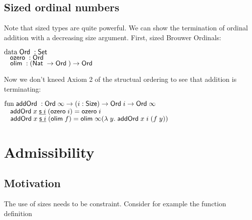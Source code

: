\subsection{Sized ordinal numbers}
Note that sized types are quite powerful. 
We can show the termination of ordinal addition with a decreasing size argument.
First, sized Brouwer Ordinals:
\begin{bsp}
$\mathrm{data}\; \mathsf{Ord}\; : \mathsf{Set}$ \\
$\hspace*{3mm} \mathsf{ozero}\; : \mathsf{Ord}\; $\\
$\hspace*{3mm} \mathsf{olim}\; : (\mathsf{Nat}\; \rightarrow \mathsf{Ord}\; ) \rightarrow \mathsf{Ord}\; $
\end{bsp}
Now we don't kneed Axiom 2 of the structual ordering to see that addition is terminating:
\begin{bsp}
$\mathrm{fun}\; \mathsf{addOrd}\; : \mathsf{Ord}\; \infty \rightarrow ( i : \mathsf{Size} ) \rightarrow{\mathsf{Ord}\;i \rightarrow\mathsf{Ord}\;\infty }$\\
$\hspace*{3mm} \mathsf{addOrd}\; x\; \underline{\mathsf{s}\; i}\; (\mathsf{ozero}\; i) = \mathsf{ozero}\; i $\\
$\hspace*{3mm} \mathsf{addOrd}\; x\; \underline{\mathsf{s}\; i}\; (\mathsf{olim}\; f)  = \mathsf{olim}\; \infty ( \lambda\; y .\; \mathsf{addOrd}\;  x \; i \; (f \; y))  $
\end{bsp}

\section{Admissibility}
\subsection{Motivation}
The use of sizes needs to be constraint.
Consider for example the function definition

